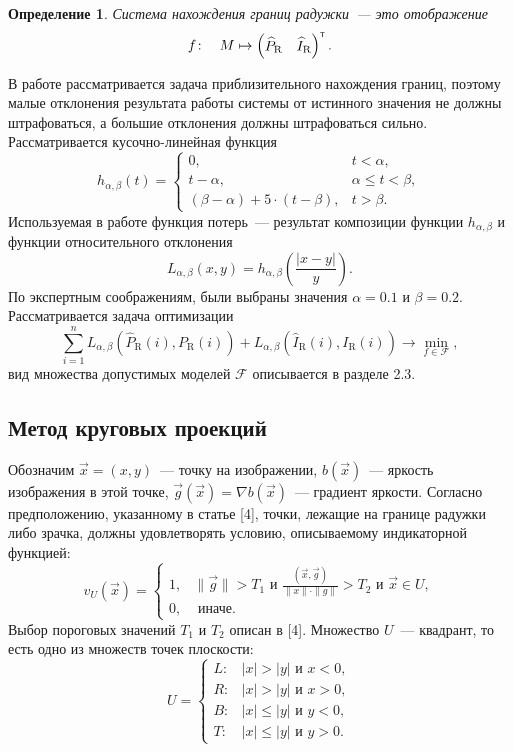\documentclass[12pt, twoside]{article}
\newtheorem{definition}{Определение}
\begin{document}
\begin{definition}
\emph{Система нахождения границ радужки}~--- это отображение
\[f\!: \quad M \mapsto \begin{pmatrix}\widehat{P}_\text{R} &  \widehat{I}_\text{R}\end{pmatrix}^{\text{\tiny\sffamily\upshape\mdseries T}}.\]
\end{definition}
В работе рассматривается задача приблизительного нахождения границ, поэтому малые отклонения результата работы системы от истинного значения не должны штрафоваться, а большие отклонения должны штрафоваться сильно. Рассматривается кусочно-линейная функция
\[
h_{\alpha, \beta}(t) = \begin{cases}0, &t < \alpha, \\ t - \alpha, &\alpha \leqslant t < \beta, \\ (\beta - \alpha) + 5\cdot (t - \beta), & t > \beta.\end{cases}
\]
Используемая в работе функция потерь~--- результат композиции функции $h_{\alpha, \beta}$ и функции относительного отклонения
\[
L_{\alpha, \beta} (x, y) = h_{\alpha, \beta}\left(\frac{|x-y|}{y}\right).
\]
По экспертным соображениям, были выбраны значения $\alpha = 0.1$ и $\beta = 0.2$. Рассматривается задача оптимизации
\begin{equation}\label{mainproblem}
\sum_{i=1}^n L_{\alpha, \beta} \left(\widehat{P}_\text{R}(i), P_\text{R}(i)\right) + L_{\alpha, \beta} \left(\widehat{I}_\text{R}(i), I_\text{R}(i)\right) \to \min_{f\in \mathcal{F}},
\end{equation}
вид множества допустимых моделей $\mathcal{F}$ описывается в разделе 2.3.

\subsection{Метод круговых проекций}
Обозначим $\vec{x} = (x, y)$~--- точку на изображении, $b(\vec{x})$~--- яркость изображения в этой точке, $\vec{g}(\vec{x}) = \nabla b(\vec{x})$~--- градиент яркости. Согласно предположению, указанному в статье [4], точки, лежащие на границе радужки либо зрачка, должны удовлетворять условию, описываемому индикаторной функцией:
\[
v_U(\vec{x}) = \begin{cases}1, & \| \vec{g} \| > T_1 \text{ и } \frac{(\vec{x}, \vec{g})}{\| x \| \cdot \| g \|} > T_2 \text{ и } \vec{x} \in U, \\ 0, & \text{ иначе.}\end{cases}
\]
Выбор пороговых значений $T_1$ и $T_2$ описан в [4]. Множество $U$~--- квадрант, то есть одно из множеств точек плоскости:
\[
U = \begin{cases}L\!: & |x| > |y| \text{ и } x < 0, \\ R\!: & |x| > |y| \text{ и } x > 0, \\ B\!: & |x| \leqslant |y| \text{ и } y < 0, \\ T\!: & |x| \leqslant |y| \text{ и } y > 0.\end{cases}
\]
\end{document}
